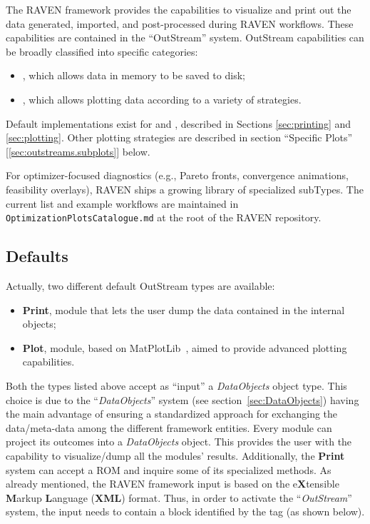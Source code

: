 The RAVEN framework provides the capabilities to visualize and print out the
data generated, imported, and post-processed during RAVEN workflows.
%
These capabilities are contained in the ``OutStream'' system.
%
OutStream capabilities can be broadly classified into specific categories:
\vspace{-5mm}
\begin{itemize}
  \itemsep0em
  \item {}, which allows data in memory to be saved to disk;
  \item {}, which allows plotting data according to a variety of strategies.
\end{itemize}
\vspace{-5mm}
Default implementations exist for  and , described in
Sections \ref{sec:printing} and \ref{sec:plotting}. Other plotting strategies are described in section
``Specific Plots'' [\ref{sec:outstreams.subplots}] below.

For optimizer-focused diagnostics (e.g., Pareto fronts, convergence animations, feasibility overlays),
RAVEN ships a growing library of specialized  subTypes. The current list and example workflows
are maintained in \texttt{OptimizationPlotsCatalogue.md} at the root of the RAVEN repository.

\subsection{Defaults}
Actually, two different default OutStream types are available:
\vspace{-5mm}
\begin{itemize}
  \itemsep0em
  \item \textbf{Print}, module that lets the user dump the data contained in the
  internal objects;
  \item \textbf{Plot}, module, based on MatPlotLib~\cite{MatPlotLib}, aimed to
  provide advanced plotting capabilities.
\end{itemize}
\vspace{-5mm}
Both the types listed above accept as ``input'' a \textit{DataObjects} object
type.
%
This choice is due to the ``\textit{DataObjects}'' system (see
section~\ref{sec:DataObjects}) having the main advantage of ensuring a standardized
approach for exchanging the data/meta-data among the different framework
entities.
%
Every module can project its outcomes into a \textit{DataObjects} object.
%
This provides the user with the capability to visualize/dump all the modules'
results.
%
Additionally, the \textbf{Print} system can accept a ROM and inquire some of its
specialized methods.
%
As already mentioned, the RAVEN
framework input is based on the e\textbf{X}tensible \textbf{M}arkup
\textbf{L}anguage (\textbf{XML}) format.
%
Thus, in order to activate the ``\textit{OutStream}'' system, the input needs to
contain a block identified by the  tag (as shown
below).

